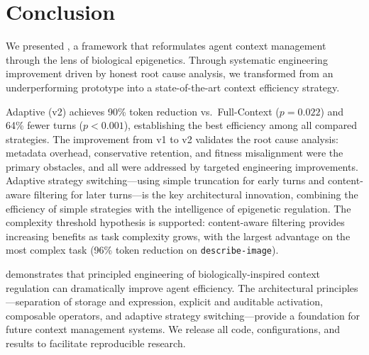 \section{Conclusion}

We presented \EpiContext, a framework that reformulates agent context management through the lens of biological epigenetics. Through systematic engineering improvement driven by honest root cause analysis, we transformed \EpiContext{} from an underperforming prototype into a state-of-the-art context efficiency strategy.

Adaptive \EpiContext{} (v2) achieves 90\% token reduction vs.\ Full-Context ($p = 0.022$) and 64\% fewer turns ($p < 0.001$), establishing the best efficiency among all compared strategies. The improvement from v1 to v2 validates the root cause analysis: metadata overhead, conservative retention, and fitness misalignment were the primary obstacles, and all were addressed by targeted engineering improvements. Adaptive strategy switching---using simple truncation for early turns and content-aware filtering for later turns---is the key architectural innovation, combining the efficiency of simple strategies with the intelligence of epigenetic regulation. The complexity threshold hypothesis is supported: content-aware filtering provides increasing benefits as task complexity grows, with the largest advantage on the most complex task (96\% token reduction on \texttt{describe-image}).

\EpiContext{} demonstrates that principled engineering of biologically-inspired context regulation can dramatically improve agent efficiency. The architectural principles---separation of storage and expression, explicit and auditable activation, composable operators, and adaptive strategy switching---provide a foundation for future context management systems. We release all code, configurations, and results to facilitate reproducible research.